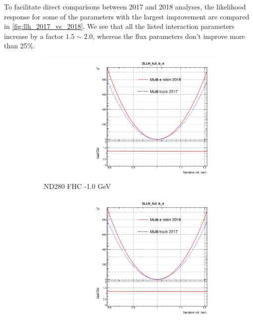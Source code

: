 To facilitate direct comparisons between 2017 and 2018 analyses, the likelihood response for some of the parameters with the largest improvement are compared in \autoref{fig:llh_2017_vs_2018}. We see that all the listed interaction parameters increase by a factor $1.5\sim2.0$, whereas the flux parameters don't improve more than 25\%.
\begin{figure}[h]
	\centering
	\begin{subfigure}[t]{0.32\textwidth}
		\includegraphics[width=\textwidth,page=1, trim={0mm 0mm 0mm 9mm}, clip]{figures/mach3/2018/llh/MultiPi_vs_MultiTrack_TotalLLH_2017vs2018}
		\caption{ND280 FHC -1.0 GeV}
	\end{subfigure}
	\begin{subfigure}[t]{0.32\textwidth}
		\includegraphics[width=\textwidth,page=10, trim={0mm 0mm 0mm 9mm}, clip]{figures/mach3/2018/llh/MultiPi_vs_MultiTrack_TotalLLH_2017vs2018}

\end{subfigure}
\end{figure}
